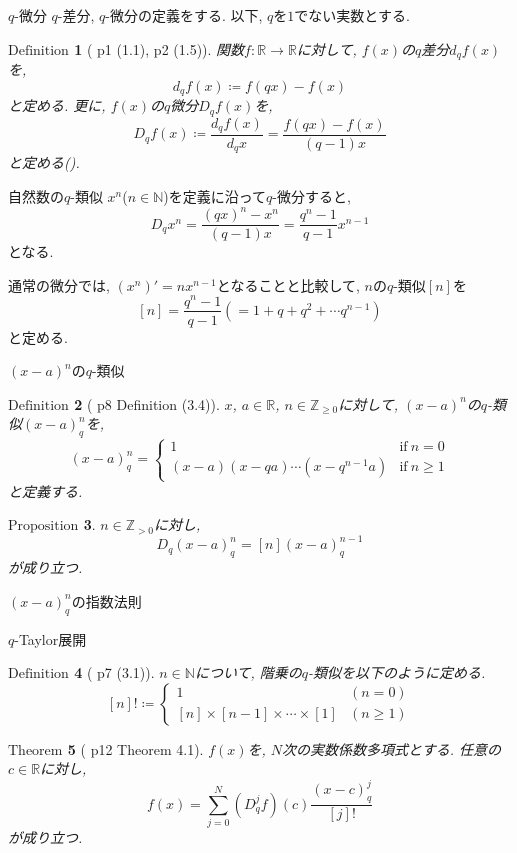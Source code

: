 \documentclass[dvipdfmx,cjk]{beamer}
\theoremstyle{mystyle}
\newtheorem{df}{$\textrm{Definition}$}[section]
\newtheorem{prop}[df]{$\textrm{Proposition}$}
\newtheorem{thm}[df]{$\textrm{Theorem}$}
\newcommand{\N}{\mathbb{N}}
\newcommand{\Z}{\mathbb{Z}}
\newcommand{\R}{\mathbb{R}}
\newcommand{\0}{\textbf{0}}
\begin{document}
\begin{frame}{$q$-微分}
  $q$-差分, $q$-微分の定義をする. 以下, $q$を$1$でない実数とする. 
  \begin{df}[\cite{Kac} p1 (1.1), p2 (1.5)]
    関数$f : \R \to \R$に対して, $f(x)$の$q$差分$d_q f(x)$を, 
    \[
      d_q f(x) \coloneqq f (qx) - f(x)
    \]
    と定める. 更に, $f(x)$の$q$微分$D_q f(x)$を, 
    \[
      D_q f(x) \coloneqq \frac{d_q f(x)}{d_q x} = \frac{f(qx) - f(x)}{(q - 1) x}
    \]
    と定める(\cite{Kac}). 
  \end{df}
\end{frame}

\begin{frame}{自然数の$q$-類似}
  $x^n$($n \in \N$)を定義に沿って$q$-微分すると, 
  \[
    D_q x^n = \frac{(qx)^n - x^n}{(q - 1) x} = \frac{q^n - 1}{q - 1} x^{n - 1}
  \]
  となる. 
  
  通常の微分では, $(x^n)' = n x^{n - 1}$となることと比較して, $n$の$q$-類似$[n]$を
  \[
    [n] = \frac{q^n - 1}{q - 1} (= 1 + q + q^2 + \cdots q^{n - 1})
  \]
  と定める.
\end{frame}

\begin{frame}{$(x - a)^n$の$q$-類似} 
	\begin{df}[\cite{Kac} p8 Definition (3.4)]
	  $x$, $a \in \R$, $n \in \Z_{\ge 0}$に対して, $(x - a)^n$の$q$-類似$(x - a)^n_q$を, 
	  \[
	  (x - a)^n_q = \begin{cases}
	                      1 & \text{if}\ n = 0 \\
	                      (x - a) (x - qa) \cdots (x - q^{n - 1} a) & \text{if}\ n \ge 1
	                    \end{cases}
	  \]
	  と定義する. 
	\end{df}
	\begin{prop} \label{Dq_qbinom_nonneg}
	  $n\in\Z_{>0}$に対し, 
	  \[
	    D_q(x-a)^n_q = [n](x-a)^{n-1}_q
	  \]
	  が成り立つ. 
	\end{prop}
\end{frame}

\begin{frame}{$(x - a)^n_q$の指数法則}

\end{frame}

\begin{frame}{$q$-Taylor展開}
	\begin{df}[\cite{Kac} p7 (3.1)]
		$n \in \N$について, 階乗の$q$-類似を以下のように定める. 
    \[
      [n]! \coloneqq \begin{cases}
                            1 & (n=0)\\
                            [n]\times[n-1]\times\cdots\times[1] & (n\ge1)
                          \end{cases}
    \]
  \end{df}
  \begin{thm}[\cite{Kac} p12 Theorem 4.1] \label{q_Taylor}
	 $f(x)$を, $N$次の実数係数多項式とする. 任意の$c\in\R$に対し, 
	 \[
	   f(x) = \sum_{j=0}^N (D_q^jf)(c)\frac{(x-c)^j_q}{[j]!}
	 \]
	 が成り立つ. 
  \end{thm}
\end{frame}
\end{document}
